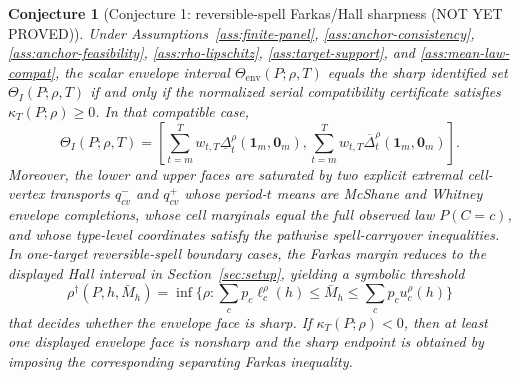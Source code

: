 \documentclass[11pt]{article}
\theoremstyle{definition}
\theoremstyle{plain}
\newtheorem{conjecture}{Conjecture}
\theoremstyle{remark}
\begin{document}
\begin{conjecture}[Conjecture 1: reversible-spell Farkas/Hall sharpness (NOT YET PROVED)]\label{conj:metric-sharpness}
Under Assumptions~\ref{ass:finite-panel}, \ref{ass:anchor-consistency}, \ref{ass:anchor-feasibility}, \ref{ass:rho-lipschitz}, \ref{ass:target-support}, and \ref{ass:mean-law-compat}, the scalar envelope interval \(\Theta_{\mathrm{env}}(P;\rho,T)\) equals the sharp identified set \(\Theta_I(P;\rho,T)\) if and only if the normalized serial compatibility certificate satisfies \(\kappa_T(P;\rho)\ge 0\).  In that compatible case,
\[
  \Theta_I(P;\rho,T)
  =
  \left[
    \sum_{t=m}^T w_{t,T}\underline\Delta_t^\rho(\mathbf{1}_m,\mathbf{0}_m),
    \sum_{t=m}^T w_{t,T}\overline\Delta_t^\rho(\mathbf{1}_m,\mathbf{0}_m)
  \right].
\]
Moreover, the lower and upper faces are saturated by two explicit extremal cell-vertex transports \(q^-_{cv}\) and \(q^+_{cv}\) whose period-\(t\) means are McShane and Whitney envelope completions, whose cell marginals equal the full observed law \(P(C=c)\), and whose type-level coordinates satisfy the pathwise spell-carryover inequalities.  In one-target reversible-spell boundary cases, the Farkas margin reduces to the displayed Hall interval in Section~\ref{sec:setup}, yielding a symbolic threshold
\[
  \rho^\dagger(P,h,\bar M_h)
  =
  \inf\{\rho:\sum_c p_c \ell_c^\rho(h)\le \bar M_h\le \sum_c p_c u_c^\rho(h)\}
\]
that decides whether the envelope face is sharp.  If \(\kappa_T(P;\rho)<0\), then at least one displayed envelope face is nonsharp and the sharp endpoint is obtained by imposing the corresponding separating Farkas inequality.
\end{conjecture}
\end{document}
